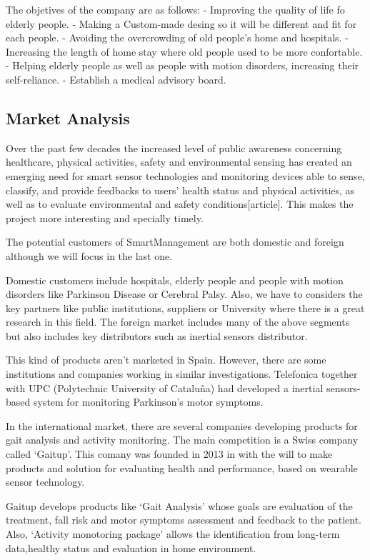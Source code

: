 The objetives of the company are as follows:
-	Improving the quality of life fo elderly people.
-	Making a Custom-made desing so it will be different and fit for each people.
-	Avoiding the overcrowding of old people’s home and hospitals.
-	Increasing the length of home stay where old people used to be more confortable.
-	Helping elderly people as well as people with motion disorders, increasing their self-reliance.
-	Establish a medical advisory board.

\subsection{Market Analysis}
 Over the past few decades the increased level of public awareness concerning healthcare, physical activities, safety and environmental sensing has created an emerging need for smart sensor technologies and monitoring devices able to sense, classify, and provide feedbacks to users’ health status and physical activities, as well as to evaluate environmental and safety conditions[article]. This makes the project more interesting and specially timely.
 
 The potential customers of SmartManagement are both domestic and foreign although we will focus in the last one.
 
 Domestic customers include hospitals, elderly people and people with motion disorders like Parkinson Disease or Cerebral Palsy. Also, we have to considers the key partners like public institutions, suppliers or University where there is a great research in this field.
  The foreign market includes many of the above segments but also includes key distributors such as inertial sensors distributor.
 
 This kind of products aren’t marketed in Spain. However, there are some institutions and companies working in similar investigations. Telefonica  together with UPC (Polytechnic University of Cataluña) had developed a inertial sensors-based system for monitoring Parkinson's motor symptoms\cite{rempark}.
 
 In the international market, there are several companies developing products for gait analysis and activity monitoring. The main competition is a Swiss company called ‘Gaitup’\cite{gaitup}. This comany was founded in 2013 in with the will to make products and solution for evaluating health and performance, based on wearable sensor technology.
 
 Gaitup develops products like ‘Gait Analysis’ whose goals are evaluation of the treatment, fall risk and motor symptoms assessment and feedback to the patient. Also, ‘Activity monotoring package’ allows the identification from long-term data,healthy status and  evaluation in home environment.
 
